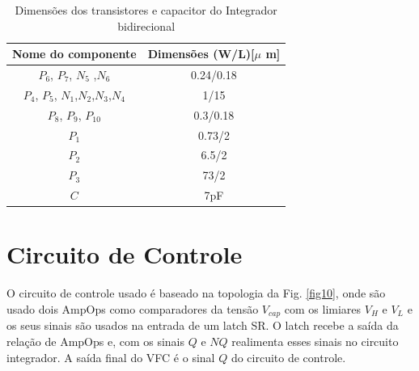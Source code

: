 \begin{table}[htb]
\centering
\begin{tabular}{c|c}
\hline 
\hline 
\textbf{Nome do componente} & \textbf{Dimensões (W/L)[$\mu$ m]} \\ 
\hline 
\hline 
$P_6$, $P_7$, $N_5$ ,$N_6$ & 0.24/0.18 \\ 
\hline 
$P_4$, $P_5$, $N_1$,$N_2$,$N_3$,$N_4$ & 1/15 \\ 
\hline 
$P_8$, $P_9$, $P_10$  & 0.3/0.18 \\ 
\hline 
$P_1$ & 0.73/2 \\ 
\hline 
$P_2$ & 6.5/2 \\ 
\hline 
$P_3$ & 73/2 \\ 
\hline 
$C$ & 7pF \\ 
\hline 
\end{tabular} 
\caption{Dimensões dos transistores e capacitor do Integrador bidirecional}
\label{tab:integrador}
\end{table}


\section{Circuito de Controle} 

O circuito de controle usado é baseado na topologia da Fig. \ref{fig10}, onde são usado dois AmpOps como comparadores da tensão $V_{cap}$ com os limiares $V_H$ e $V_L$ e os seus sinais são usados na entrada de um latch SR. O latch recebe a saída da relação de AmpOps e, com os sinais $Q$ e $NQ$ realimenta esses sinais no circuito integrador. A saída final do VFC é o sinal $Q$ do circuito de controle.


